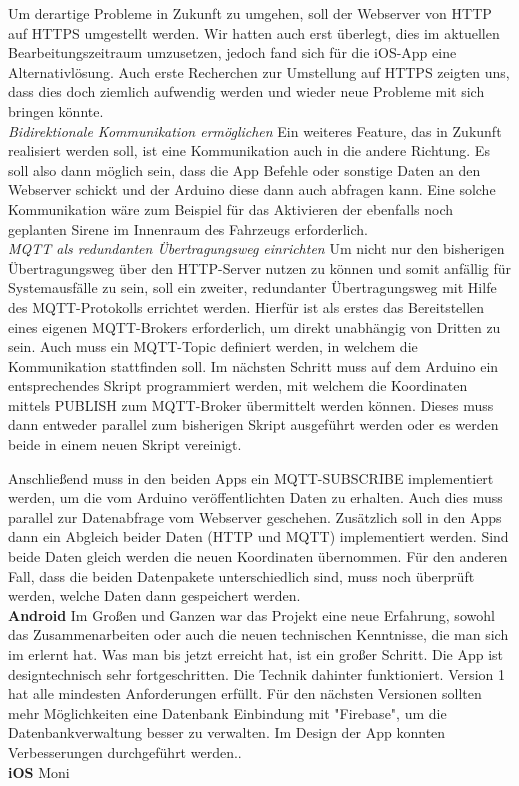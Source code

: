 Um derartige Probleme in Zukunft zu umgehen, soll der Webserver von HTTP auf HTTPS umgestellt werden. Wir hatten auch erst überlegt, dies im aktuellen Bearbeitungszeitraum umzusetzen, jedoch fand sich für die iOS-App eine Alternativlösung. Auch erste Recherchen zur Umstellung auf HTTPS zeigten uns, dass dies doch ziemlich aufwendig werden und wieder neue Probleme mit sich bringen könnte.
\\
\textit{Bidirektionale Kommunikation ermöglichen}
Ein weiteres Feature, das in Zukunft realisiert werden soll, ist eine Kommunikation auch in die andere Richtung. Es soll also dann möglich sein, dass die App Befehle oder sonstige Daten an den Webserver schickt und der Arduino diese dann auch abfragen kann. Eine solche Kommunikation wäre zum Beispiel für das Aktivieren der ebenfalls noch geplanten Sirene im Innenraum des Fahrzeugs erforderlich.
\\
\textit{MQTT als redundanten Übertragungsweg einrichten}
Um nicht nur den bisherigen Übertragungsweg über den HTTP-Server nutzen zu können und somit anfällig für Systemausfälle zu sein, soll ein zweiter, redundanter Übertragungsweg mit Hilfe des MQTT-Protokolls errichtet werden. Hierfür ist als erstes das Bereitstellen eines eigenen MQTT-Brokers erforderlich, um direkt unabhängig von Dritten zu sein. Auch muss ein MQTT-Topic definiert werden, in welchem die Kommunikation stattfinden soll. Im nächsten Schritt muss auf dem Arduino ein entsprechendes Skript programmiert werden, mit welchem die Koordinaten mittels PUBLISH zum MQTT-Broker übermittelt werden können. Dieses muss dann entweder parallel zum bisherigen Skript ausgeführt werden oder es werden beide in einem neuen Skript vereinigt.

 Anschließend muss in den beiden Apps ein MQTT-SUBSCRIBE implementiert werden, um die vom Arduino veröffentlichten Daten zu erhalten. Auch dies muss parallel zur Datenabfrage vom Webserver geschehen. Zusätzlich soll in den Apps dann ein Abgleich beider Daten (HTTP und MQTT) implementiert werden. Sind beide Daten gleich werden die neuen Koordinaten übernommen. Für den anderen Fall, dass die beiden Datenpakete unterschiedlich sind, muss noch überprüft werden, welche Daten dann gespeichert werden. 
 \\
\textbf{Android} 
Im Großen und Ganzen war das Projekt eine neue Erfahrung, sowohl das Zusammenarbeiten oder auch die neuen technischen Kenntnisse, die man sich im erlernt hat.
Was man bis jetzt erreicht hat, ist ein großer Schritt. Die App ist designtechnisch sehr fortgeschritten. Die Technik dahinter funktioniert. Version 1 hat alle mindesten Anforderungen erfüllt.
Für den nächsten Versionen sollten mehr Möglichkeiten eine Datenbank Einbindung mit "Firebase", um die Datenbankverwaltung besser zu verwalten. Im Design der App konnten Verbesserungen durchgeführt werden..
\\
\textbf{iOS} Moni